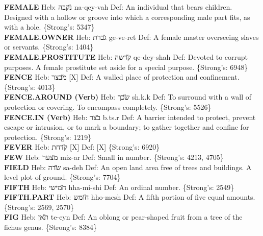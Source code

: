{\textbf{FEMALE} Heb: {\large\H נקבה} na-qey-vah Def: An individual that bears children. Designed with a hollow or groove into which a corresponding male part fits, as with a hole. \{Strong's: 5347\}\hfill{}\\

\textbf{FEMALE.OWNER} Heb: {\large\H גברת} ge-ve-ret Def: A female master overseeing slaves or servants. \{Strong's: 1404\}\hfill{}\\

\textbf{FEMALE.PROSTITUTE} Heb: {\large\H קדשה} qe-dey-shah Def: Devoted to corrupt purposes. A female prostitute set aside for a special purpose. \{Strong's: 6948\}\hfill{}\\

\textbf{FENCE} Heb: {\large\H מבצר} {[}X{]} Def: A walled place of protection and confinement. \{Strong's: 4013\}\hfill{}\\

\textbf{FENCE.AROUND (Verb)} Heb: {\large\H שכך} sh.k.k Def: To surround with a wall of protection or covering. To encompass completely. \{Strong's: 5526\}\hfill{}\\

\textbf{FENCE.IN (Verb)} Heb: {\large\H בצר} b.ts.r Def: A barrier intended to protect, prevent escape or intrusion, or to mark a boundary; to gather together and confine for protection. \{Strong's: 1219\}\hfill{}\\

\textbf{FEVER} Heb: {\large\H קדחת} {[}X{]} Def: {[}X{]} \{Strong's: 6920\}\hfill{}\\

\textbf{FEW} Heb: {\large\H מצער} miz-ar Def: Small in number. \{Strong's: 4213, 4705\}\hfill{}\\

\textbf{FIELD} Heb: {\large\H שדה} sa-deh Def: An open land area free of trees and buildings. A level plot of ground. \{Strong's: 7704\}\hfill{}\\

\textbf{FIFTH} Heb: {\large\H חמישי} hha-mi-shi Def: An ordinal number. \{Strong's: 2549\}\hfill{}\\

\textbf{FIFTH.PART} Heb: {\large\H חומש} hho-mesh Def: A fifth portion of five equal amounts. \{Strong's: 2569, 2570\}\hfill{}\\

\textbf{FIG} Heb: {\large\H תאן} te-eyn Def: An oblong or pear-shaped fruit from a tree of the fichus genus. \{Strong's: 8384\}\hfill{}\\

}
